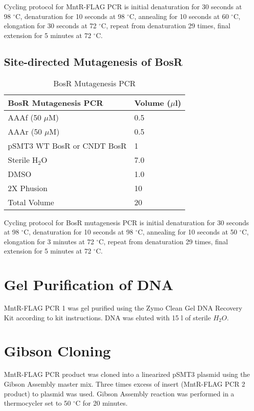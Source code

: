 \documentclass[12pt,twoside]{reedthesis}
\begin{document}
Cycling protocol for MntR-FLAG PCR is initial denaturation for 30 seconds at 98 $^{\circ}$C, denaturation for 10 seconds at 98 $^{\circ}$C, annealing for 10 seconds at 60 $^{\circ}$C, elongation for 30 seconds at 72 $^{\circ}$C, repeat from denaturation 29 times, final extension for 5 minutes at 72 $^{\circ}$C. 


 \subsection{Site-directed Mutagenesis of BosR}
\begin{table}[H]
	\caption{BosR Mutagenesis PCR} 
	\label{BosRmutpcr}
	\begin{tabular}{|l| | l|}
		\hline
		BosR Mutagenesis PCR & Volume ($\mu$l)  \\
		\hline 
		AAAf (50 $\mu$M) & 0.5   \\ 
		AAAr (50 $\mu$M) & 0.5 \\  			
		pSMT3 WT BosR or CNDT BosR & 1   \\
		Sterile H$_{2}$O & 7.0   \\ 
		DMSO & 1.0 \\  
		2X Phusion & 10  \\     
		\hline   
		Total Volume & 20  \\
		\hline
	\end{tabular}
\end{table}

Cycling protocol for BosR mutagenesis PCR is initial denaturation for 30 seconds at 98 $^{\circ}$C, denaturation for 10 seconds at 98 $^{\circ}$C, annealing for 10 seconds at 50 $^{\circ}$C, elongation for 3 minutes at 72 $^{\circ}$C, repeat from denaturation 29 times, final extension for 5 minutes at 72 $^{\circ}$C. 


\section{Gel Purification of DNA}

MntR-FLAG PCR 1 was gel purified using the Zymo Clean Gel DNA Recovery Kit according to kit instructions. DNA was eluted with 15 \micro l of sterile $H_{2}O$.

\section{Gibson Cloning}
MntR-FLAG PCR product was cloned into a linearized pSMT3 plasmid using the Gibson Assembly master mix. Three times excess of insert (MntR-FLAG PCR 2 product) to plasmid was used. Gibson Assembly reaction was performed in a thermocycler set to 50 $^\circ$C for 20 minutes. 
\end{document}
